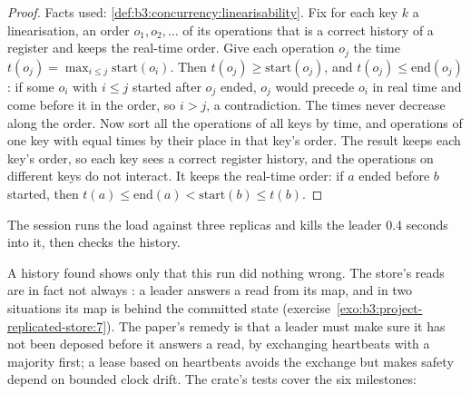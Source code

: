 \begin{proof}
Facts used: \cref{def:b3:concurrency:linearisability}. Fix for each key $k$ a linearisation, an order $o_1, o_2, \ldots$ of its operations that is a correct history of a register and keeps the real-time order. Give each operation $o_j$ the time $t(o_j) = \max_{i \leq j} \mathrm{start}(o_i)$. Then $t(o_j) \geq \mathrm{start}(o_j)$, and $t(o_j) \leq \mathrm{end}(o_j)$: if some $o_i$ with $i \leq j$ started after $o_j$ ended, $o_j$ would precede $o_i$ in real time and come before it in the order, so $i > j$, a contradiction. The times never decrease along the order. Now sort all the operations of all keys by time, and operations of one key with equal times by their place in that key's order. The result keeps each key's order, so each key sees a correct register history, and the operations on different keys do not interact. It keeps the real-time order: if $a$ ended before $b$ started, then $t(a) \leq \mathrm{end}(a) < \mathrm{start}(b) \leq t(b)$.
\end{proof}

The session runs the load against three replicas and kills the leader 0.4 seconds into it, then checks the history.

\label{out:b3:project-replicated-store:m6}

A history found  shows only that this run did nothing wrong. The store's reads are in fact not always : a leader answers a read from its map, and in two situations its map is behind the committed state (exercise~\ref{exo:b3:project-replicated-store:7}). The  paper's remedy is that a leader must make sure it has not been deposed before it answers a read, by exchanging heartbeats with a majority first; a lease based on heartbeats avoids the exchange but makes safety depend on bounded clock drift. %
The crate's tests cover the six milestones:

